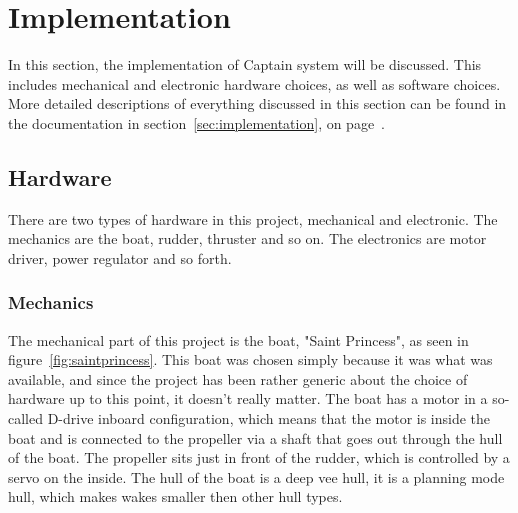 \chapter{Implementation}
In this section, the implementation of Captain system will be discussed. This includes mechanical and electronic hardware choices, as well as software choices.
More detailed descriptions of everything discussed in this section can be found in the documentation in section~\ref{sec:implementation}, on page~\pageref{sec:implementation}.

\section{Hardware}
There are two types of hardware in this project, mechanical and electronic. The mechanics are the boat, rudder, thruster and so on. The electronics are motor driver, power regulator and so forth.

\subsection{Mechanics}
The mechanical part of this project is the boat, "Saint Princess", as seen in figure~\ref{fig:saintprincess}. This boat was chosen simply because it was what was available, and since the project has been rather generic about the choice of hardware up to this point, it doesn't really matter. The boat has a motor in a so-called D-drive inboard configuration\cite{motor_config}, which means that the motor is inside the boat and is connected to the propeller via a shaft that goes out through the hull of the boat. The propeller sits just in front of the rudder, which is controlled by a servo on the inside. The hull of the boat is a deep vee hull\cite{hull-types}, it is a planning mode hull, which makes wakes smaller then other hull types.

